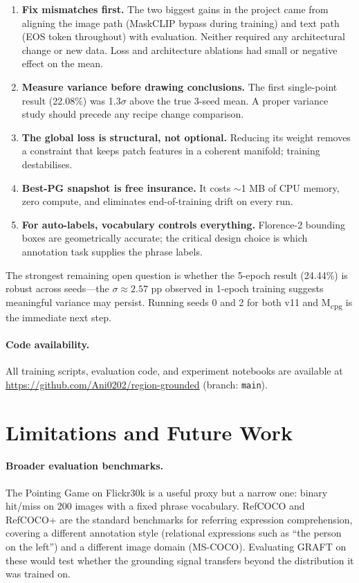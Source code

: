 \documentclass{article}
\begin{document}
\begin{enumerate}
\item \textbf{Fix mismatches first.} The two biggest gains in the project came
  from aligning the image path (MaskCLIP bypass during training) and text path
  (EOS token throughout) with evaluation. Neither required any architectural
  change or new data. Loss and architecture ablations had small or negative
  effect on the mean.
\item \textbf{Measure variance before drawing conclusions.} The first
  single-point result (22.08\%) was 1.3$\sigma$ above the true 3-seed mean.
  A proper variance study should precede any recipe change comparison.
\item \textbf{The global loss is structural, not optional.} Reducing its weight
  removes a constraint that keeps patch features in a coherent manifold;
  training destabilises.
\item \textbf{Best-PG snapshot is free insurance.} It costs $\sim$1 MB of CPU
  memory, zero compute, and eliminates end-of-training drift on every run.
\item \textbf{For auto-labels, vocabulary controls everything.} Florence-2
  bounding boxes are geometrically accurate; the critical design choice is
  which annotation task supplies the phrase labels.
\end{enumerate}

The strongest remaining open question is whether the 5-epoch result (24.44\%)
is robust across seeds---the $\sigma \approx 2.57$ pp observed in 1-epoch
training suggests meaningful variance may persist. Running seeds 0 and 2 for
both v11 and M\textsubscript{cpg} is the immediate next step.

\paragraph{Code availability.}
All training scripts, evaluation code, and experiment notebooks are available at
\url{https://github.com/Ani0202/region-grounded} (branch: \texttt{main}).

\section{Limitations and Future Work}
\label{sec:future}

\paragraph{Broader evaluation benchmarks.}
The Pointing Game on Flickr30k is a useful proxy but a narrow one: binary
hit/miss on 200 images with a fixed phrase vocabulary. RefCOCO and RefCOCO+
are the standard benchmarks for referring expression comprehension, covering a
different annotation style (relational expressions such as ``the person on the
left'') and a different image domain (MS-COCO). Evaluating GRAFT on these
would test whether the grounding signal transfers beyond the distribution it
was trained on.
\end{document}
